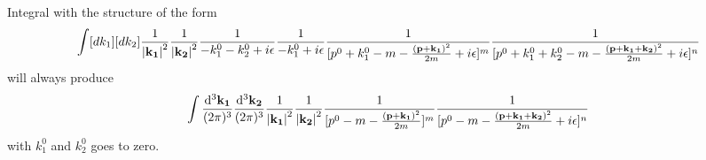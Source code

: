 \documentclass{article}
\begin{document}
\clearpage
\begin{appendices}
  Integral with the structure of the form 
  \begin{align*}
	\int[dk_1][dk_2]\frac{1}{\vb{\abs{k_1}}^2}\frac{1}{\vb{\abs{k_2}}^2}\frac{1}{-k_1^0-k_2^0+i\epsilon}\frac{1}{-k_1^0+i\epsilon}\frac{1}{[p^0+k_1^0-m-\frac{\vb{(p+k_1)}^2}{2m}+i\epsilon]^m}\frac{1}{[p^0+k_1^0+k_2^0-m-\frac{\vb{(p+k_1+k_2)}^2}{2m}+i\epsilon]^n}
  \end{align*}
  will always produce
  \begin{align*}
	\int\frac{\dd^3\vb{k_1}}{(2\pi)^3}\frac{\dd^3\vb{k_2}}{(2\pi)^3}\frac{1}{\vb{\abs{k_1}}^2}\frac{1}{\vb{\abs{k_2}}^2}\frac{1}{[p^0-m-\frac{\vb{(p+k_1)}^2}{2m}]^m}\frac{1}{[p^0-m-\frac{\vb{(p+k_1+k_2)}^2}{2m}+i\epsilon]^n}
  \end{align*}
  with $k_1^0$ and $k_2^0$ goes to zero.


\end{appendices}
\end{document}
